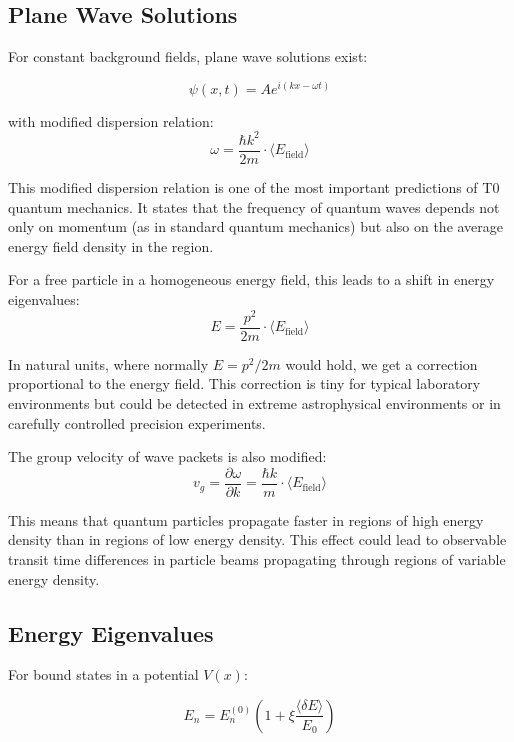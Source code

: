 \documentclass[12pt,a4paper]{article}
\newcommand{\deltaE}{\delta E}
\newcommand{\xipar}{\xi}
\theoremstyle{definition}
\theoremstyle{remark}
\begin{document}
	\subsection{Plane Wave Solutions}
	
	For constant background fields, plane wave solutions exist:
	
	\begin{equation}
		\psi(x,t) = A e^{i(kx - \omega t)}
		\label{eq:plane_wave}
	\end{equation}
	
	with modified dispersion relation:
	\begin{equation}
		\boxed{\omega = \frac{\hbar k^2}{2m} \cdot \langle E_{\text{field}} \rangle}
		\label{eq:modified_dispersion}
	\end{equation}
	
	This modified dispersion relation is one of the most important predictions of T0 quantum mechanics. It states that the frequency of quantum waves depends not only on momentum (as in standard quantum mechanics) but also on the average energy field density in the region.
	
	For a free particle in a homogeneous energy field, this leads to a shift in energy eigenvalues:
	$$E = \frac{p^2}{2m} \cdot \langle E_{\text{field}} \rangle$$
	
	In natural units, where normally $E = p^2/2m$ would hold, we get a correction proportional to the energy field. This correction is tiny for typical laboratory environments but could be detected in extreme astrophysical environments or in carefully controlled precision experiments.
	
	The group velocity of wave packets is also modified:
	$$v_g = \frac{\partial \omega}{\partial k} = \frac{\hbar k}{m} \cdot \langle E_{\text{field}} \rangle$$
	
	This means that quantum particles propagate faster in regions of high energy density than in regions of low energy density. This effect could lead to observable transit time differences in particle beams propagating through regions of variable energy density.
	
	\subsection{Energy Eigenvalues}
	
	For bound states in a potential $V(x)$:
	
	\begin{equation}
		E_n = E_n^{(0)} \left(1 + \xipar \frac{\langle \deltaE \rangle}{E_0}\right)
		\label{eq:energy_shift}
	\end{equation}
	
\end{document}
